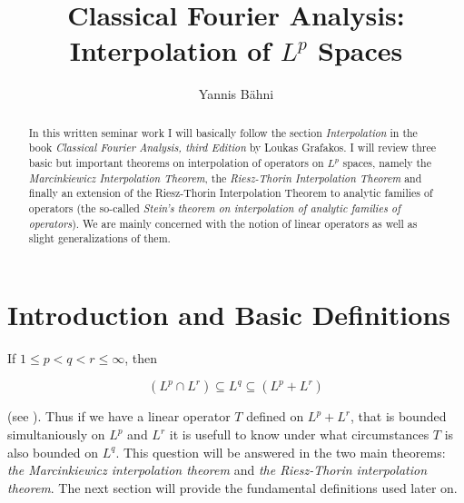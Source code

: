 



\begin{abstract}
	In this written seminar work I will basically follow the section \emph{Interpolation} in the book \emph{Classical Fourier Analysis, third Edition} by Loukas Grafakos. I will review three basic but important theorems on interpolation of operators on $L^p$ spaces, namely the \emph{Marcinkiewicz Interpolation Theorem}, the \emph{Riesz-Thorin Interpolation Theorem} and finally an extension of the Riesz-Thorin Interpolation Theorem to analytic families of operators (the so-called \emph{Stein's theorem on interpolation of analytic families of operators}). We are mainly concerned with the notion of linear operators as well as slight generalizations of them. 
\end{abstract}

\title{Classical Fourier Analysis: Interpolation of $L^p$ Spaces}
\author{Yannis B\"{a}hni}
\address[Yannis B\"{a}hni]{University of Zurich, R\"{a}mistrasse 71, 8006 Zurich}
\maketitle

\tableofcontents
\listoffigures

\mainsectionstyle

\section{Introduction and Basic Definitions}
If $1 \leqslant p < q < r \leqslant \infty$, then 

\begin{equation*}
	\left( L^p \cap L^r \right) \subseteq L^q \subseteq \left( L^p + L^r \right)
\end{equation*}

(see \cite[185]{folland:real_analysis:1999}). Thus if we have a linear operator $T$ defined on $L^p + L^r$, that is bounded simultaniously on $L^p$ and $L^r$ it is usefull to know under what circumstances $T$ is also bounded on $L^q$. This question will be answered in the two main theorems: \emph{the Marcinkiewicz interpolation theorem} and \emph{the Riesz-Thorin interpolation theorem}. The next section will provide the fundamental definitions used later on.

